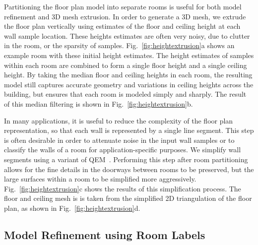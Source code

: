 \documentclass[10pt,twocolumn,twoside]{IEEEtran}
\begin{document}
Partitioning the floor plan model into separate rooms is useful for both model refinement and 3D mesh extrusion.  In order to generate a 3D mesh, we extrude the floor plan vertically using estimates of the floor and ceiling height at each wall sample location.  These heights estimates are often very noisy, due to clutter in the room, or the sparsity of samples. Fig.~\ref{fig:heightextrusion}a shows an example room with these initial height estimates.  The height estimates of samples within each room are combined to form a single floor height and a single ceiling height.  By taking the median floor and ceiling heights in each room, the resulting model still captures accurate geometry and variations in ceiling heights across the building, but ensures that each room is modeled simply and sharply.  The result of this median filtering is shown in Fig.~\ref{fig:heightextrusion}b.

In many applications, it is useful to reduce the complexity of the floor plan representation, so that each wall is represented by a single line segment.  This step is often desirable in order to attenuate noise in the input wall samples or to classify the walls of a room for application-specific purposes.  We simplify wall segments using a variant of QEM~\cite{QEM,Turner14}. Performing this step after room partitioning allows for the fine details in the doorways between rooms to be preserved, but the large surfaces within a room to be simplified more aggressively.  Fig.~\ref{fig:heightextrusion}c shows the results of this simplification process.  The floor and ceiling mesh is is taken from the simplified 2D triangulation of the floor plan, as shown in Fig.~\ref{fig:heightextrusion}d.

\subsection{Model Refinement using Room Labels}
\label{ssec:trimming}
\end{document}
